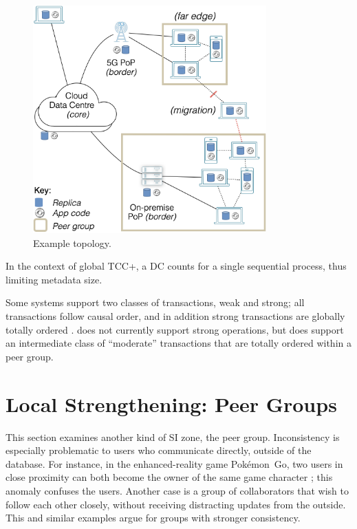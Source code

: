 \begin{figure}[tph]
  \centering
  \includegraphics[width=0.8\textwidth]{figures/topology.png}
  \caption{
    Example \system{} topology.
    \protect
  }
  \label{fig:topology}
\end{figure}

In the context of global TCC+, a DC counts for a single sequential
process, thus limiting metadata size.

Some systems support two classes of transactions, weak and strong; all
transactions follow causal order, and in addition strong transactions
are globally totally ordered \cite{rep:syn:1690, rep:syn:1845, rep:syn:sh167}.
\system{} does not currently support strong operations, but does support
an intermediate class of ``moderate'' transactions that are totally
ordered within a peer group.

\section{Local Strengthening: Peer Groups}
\label{sec:node-grouping}

This section  examines another kind of SI zone, the peer group.
Inconsistency is especially problematic to users who communicate
directly, outside of the database.
For instance, in the enhanced-reality game Pokémon~Go, two users in
close proximity can both become the owner of the same game character
\cite{pokemon-go-anomaly}; this anomaly confuses the users.
Another case is a group of collaborators that wish to follow each other
closely, without receiving  distracting updates from the
outside.
This and similar examples argue for groups with stronger consistency.


